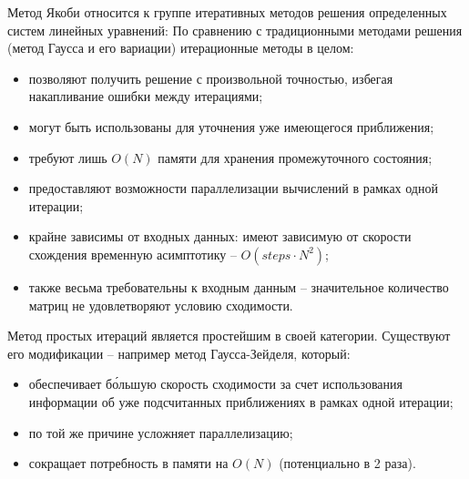 \documentclass[report.tex]{subfiles}
\begin{document}
    Метод Якоби относится к группе итеративных методов решения определенных систем линейных уравнений:
    По сравнению с традиционными методами решения (метод Гаусса и его вариации) итерационные методы в целом:
    \begin{itemize}
        \item позволяют получить решение с произвольной точностью, избегая накапливание ошибки между итерациями;
        \item могут быть использованы для уточнения уже имеющегося приближения;
        \item требуют лишь $O(N)$ памяти для хранения промежуточного состояния;
        \item предоставляют возможности параллелизации вычислений в рамках одной итерации;
        \item крайне зависимы от входных данных: имеют зависимую от скорости схождения временную асимптотику
        -- $O(steps \cdot N^2)$;
        \item также весьма требовательны к входным данным -- значительное количество матриц не удовлетворяют
        условию сходимости.
    \end{itemize}
    Метод простых итераций является простейшим в своей категории.
    Существуют его модификации -- например метод Гаусса-Зейделя, который:
    \begin{itemize}
        \item обеспечивает б\'{о}льшую скорость сходимости за счет использования информации
        об уже подсчитанных приближениях в рамках одной итерации;
        \item по той же причине усложняет параллелизацию;
        \item сокращает потребность в памяти на $O(N)$ (потенциально в 2 раза).
    \end{itemize}
\end{document}
